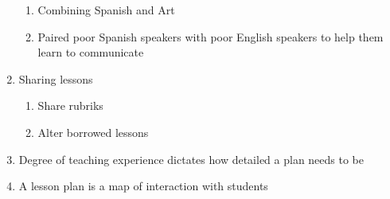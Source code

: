 \begin{enumerate}
	\begin{enumerate}
		\item Combining Spanish and Art
		\item Paired poor Spanish speakers with poor English speakers to help
			them learn to communicate
	\end{enumerate}
	\item Sharing lessons
	\begin{enumerate}
		\item Share rubriks
		\item Alter borrowed lessons
	\end{enumerate}
	\item Degree of teaching experience dictates how detailed a plan needs to be
	\item A lesson plan is a map of interaction with students
\end{enumerate}

